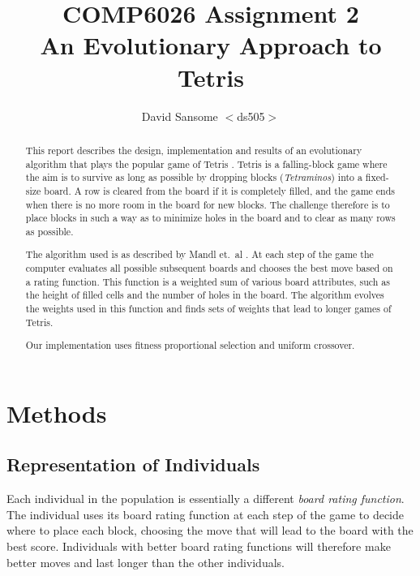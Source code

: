 \documentclass[a4paper,12pt]{article}
\title{COMP6026 Assignment 2 \\
An Evolutionary Approach to Tetris}
\author{David Sansome $<$ds505$>$}
\begin{document}


\maketitle

\begin{abstract}

This report describes the design, implementation and results of an evolutionary
algorithm that plays the popular game of Tetris \cite{AboutTetris}.
Tetris is a falling-block game where the aim is to survive as long as possible
by dropping blocks (\emph{Tetraminos}) into a fixed-size board.
A row is cleared from the board if it is completely filled, and the game ends
when there is no more room in the board for new blocks.
The challenge therefore is to place blocks in such a way as to minimize holes
in the board and to clear as many rows as possible.

The algorithm used is as described by Mandl et.\ al \cite{Mandl2005}.
At each step of the game the computer evaluates all possible subsequent boards
and chooses the best move based on a rating function.
This function is a weighted sum of various board attributes, such as the height
of filled cells and the number of holes in the board.
The algorithm evolves the weights used in this function and finds sets of
weights that lead to longer games of Tetris.

Our implementation uses fitness proportional selection and uniform crossover.

\end{abstract}

\tableofcontents

\section{Methods}

\subsection{Representation of Individuals}

Each individual in the population is essentially a different \emph{board
rating function}.
The individual uses its board rating function at each step of the game to
decide where to place each block, choosing the move that will lead to the board
with the best score.
Individuals with better board rating functions will therefore make better moves
and last longer than the other individuals.
\end{document}
